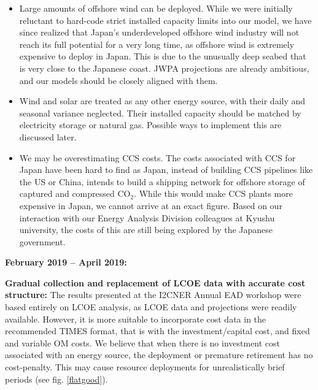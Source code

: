 \documentclass[14pt,a4paper]{article} %
\begin{document}
\begin{itemize}

\item Large amounts of offshore wind can be deployed. While we were initially reluctant to hard-code strict installed  capacity limits into our model, we have since realized that Japan's underdeveloped offshore wind industry will not reach its full potential for a very long time, as offshore wind is extremely expensive to deploy in Japan. This is due to the unusually deep seabed that is very close to the Japanese coast. \gls{JWPA} projections \cite{heger_wind_2016} are already ambitious, and our models should be closely aligned with them.\\

\item Wind and solar are treated as any other energy source, with their daily and seasonal variance neglected. Their installed capacity should be matched by electricity storage or natural gas. Possible ways to implement this are discussed later.\\

\item We may be overestimating \gls{CCS} costs. The costs associated with \gls{CCS} for Japan have been hard to find as Japan, instead of building \gls{CCS} pipelines like the US or China, intends to build a shipping network for offshore storage of captured and compressed CO$_2$. While this would make \gls{CCS} plants more expensive in Japan, we cannot arrive at an exact figure. Based on our interaction with our Energy Analysis Division colleagues at Kyushu university, the costs of this are still being explored by the Japanese government.\\

\end{itemize}

\begin{flushleft}
\textbf{February 2019 – April 2019:}
\end{flushleft}

\textbf{Gradual collection and replacement of \gls{LCOE} data with accurate cost structure:} The results presented at the \gls{I2CNER} Annual \gls{EAD} workshop \cite{chaube_dynamic_2019} were based entirely on \gls{LCOE} analysis, as \gls{LCOE} data and projections were readily available. However, it is more suitable to incorporate cost data in the recommended \gls{TIMES} format, that is with the investment/capital cost, and fixed and variable \gls{OM} costs. We believe that when there is no investment cost associated with an energy source, the deployment or premature retirement has no cost-penalty. This may cause resource deployments for unrealistically brief periods (see fig. \ref{flatgood}).\\
\end{document}
